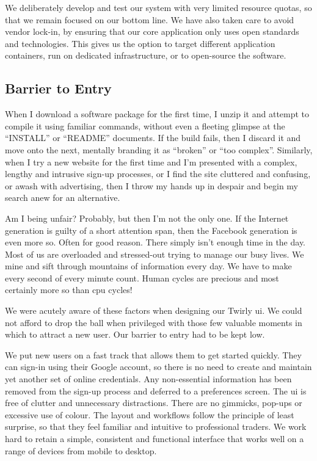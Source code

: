 \documentclass[11pt,a4paper]{article}
\newcommand{\twirly}{Twirly\cite{twirly}}
\begin{document}
We deliberately develop and test our system with very limited resource quotas, so that we remain
focused on our bottom line. We have also taken care to avoid vendor lock-in, by ensuring that our
core application only uses open standards and technologies. This gives us the option to target
different application containers, run on dedicated infrastructure, or to open-source the software.

\subsection{Barrier to Entry}

When I download a software package for the first time, I \gls{unzip} it and attempt to compile it
using familiar commands, without even a fleeting glimpse at the ``INSTALL'' or ``README''
documents. If the build fails, then I discard it and move onto the next, mentally branding it as
``broken'' or ``too complex''. Similarly, when I try a new website for the first time and I'm
presented with a complex, lengthy and intrusive sign-up processes, or I find the site cluttered and
confusing, or awash with advertising, then I throw my hands up in despair and begin my search anew
for an alternative.

Am I being unfair? Probably, but then I'm not the only one. If the Internet generation is guilty of
a short attention span, then the Facebook\cite{facebook} generation is even more so. Often for good
reason. There simply isn't enough time in the day. Most of us are overloaded and stressed-out trying
to manage our busy lives. We mine and sift through mountains of information every day. We have to
make every second of every minute count. Human cycles are precious and most certainly more so than
\gls{cpu} cycles!

We were acutely aware of these factors when designing our \twirly{} \gls{ui}. We could not afford to
drop the ball when privileged with those few valuable moments in which to attract a new user. Our
barrier to entry had to be kept low.

We put new users on a fast track that allows them to get started quickly. They can sign-in using
their Google\cite{google} account, so there is no need to create and maintain yet another set of
online credentials. Any non-essential information has been removed from the sign-up process and
deferred to a preferences screen. The \gls{ui} is free of clutter and unnecessary
distractions. There are no gimmicks, pop-ups or excessive use of colour. The layout and workflows
follow the principle of least surprise, so that they feel familiar and intuitive to professional
traders. We work hard to retain a simple, consistent and functional interface that works well on a
range of devices from mobile to desktop.
\end{document}
